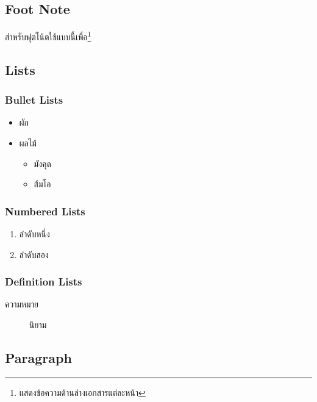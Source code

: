 \documentclass[
  letterpaper,
  DIV=11,
  numbers=noendperiod]{scrartcl}
\providecommand{\tightlist}{%
  \setlength{\itemsep}{0pt}\setlength{\parskip}{0pt}}
\begin{document}
\hypertarget{foot-note}{%
\subsection{Foot Note}\label{foot-note}}

สำหรับฟุตโน้ตใช้แบบนี้เพื่อ\footnote{แสดงข้อความด้านล่างเอกสารแต่ละหน้า}

\hypertarget{lists}{%
\subsection{Lists}\label{lists}}

\hypertarget{bullet-lists}{%
\subsubsection{Bullet Lists}\label{bullet-lists}}

\begin{itemize}
\item
  ผัก
\item
  ผลไม้

  \begin{itemize}
  \tightlist
  \item
    มังคุด
  \item
    ส้มโอ
  \end{itemize}
\end{itemize}

\hypertarget{numbered-lists}{%
\subsubsection{Numbered Lists}\label{numbered-lists}}

\begin{enumerate}
\def\labelenumi{\arabic{enumi}.}
\tightlist
\item
  ลำดับหนึ่ง
\item
  ลำดับสอง
\end{enumerate}

\hypertarget{definition-lists}{%
\subsubsection{Definition Lists}\label{definition-lists}}

\begin{description}
\item[ความหมาย]
นิยาม
\end{description}

\hypertarget{paragraph}{%
\subsection{Paragraph}\label{paragraph}}
\end{document}
